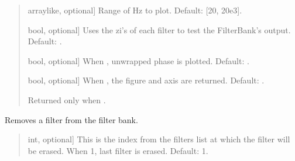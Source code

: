 \documentclass[letterpaper,10pt,english]{sphinxmanual}
\begin{document}
\begin{fulllineitems}
\begin{fulllineitems}
\begin{quote}
\begin{description}
\begin{description}
\sphinxlineitem{\sphinxstylestrong{range\_hz}}{[}array\sphinxhyphen{}like, optional{]}
\sphinxAtStartPar
Range of Hz to plot. Default: {[}20, 20e3{]}.

\sphinxlineitem{\sphinxstylestrong{test\_zi}}{[}bool, optional{]}
\sphinxAtStartPar
Uses the zi’s of each filter to test the FilterBank’s output.
Default: .

\sphinxlineitem{\sphinxstylestrong{unwrap}}{[}bool, optional{]}
\sphinxAtStartPar
When , unwrapped phase is plotted. Default: .

\sphinxlineitem{\sphinxstylestrong{returns}}{[}bool, optional{]}
\sphinxAtStartPar
When , the figure and axis are returned. Default: .

\end{description}

\begin{description}
\sphinxAtStartPar
Returned only when .

\end{description}

\end{description}\end{quote}

\end{fulllineitems}


\begin{fulllineitems}
\label{\detokenize{classes:dsptools.classes.filterbank.FilterBank.remove_filter}}
\pysigstartsignatures
{}
\pysigstopsignatures
\sphinxAtStartPar
Removes a filter from the filter bank.
\begin{quote}\begin{description}
\begin{description}
\sphinxlineitem{\sphinxstylestrong{index}}{[}int, optional{]}
\sphinxAtStartPar
This is the index from the filters list at which the filter
will be erased. When \sphinxhyphen{}1, last filter is erased.
Default: \sphinxhyphen{}1.


\end{description}
\end{description}
\end{quote}
\end{fulllineitems}
\end{fulllineitems}
\end{document}
